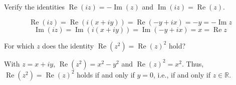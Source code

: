 \documentclass[12pt, answers]{exam}
\newcommand{\RR}{\mathbb{R}}
\renewcommand{\Re}{\operatorname{Re}}
\renewcommand{\Im}{\operatorname{Im}}
\begin{document}
\begin{questions}




    \question
    Verify the identities $\Re(iz) = -\Im(z)$ and $\Im(iz)=\Re(z)$.
    \begin{solution}
        \[\Re(iz) = \Re(i(x+iy)) = \Re(-y + ix) = -y = -\Im z\]
        \[\Im(iz) = \Im(i(x+iy)) = \Im(-y + ix) = x = \Re z\]
    \end{solution}
    
    

    \question
    For which $z$ does the identity $\Re(z^2)=\Re(z)^2$ hold?
    \begin{solution}
        With $z=x+iy$, $\Re(z^2)=x^2-y^2$ and $\Re(z)^2=x^2$.
        Thus, $\Re(z^2)=\Re(z)^2$ holds if and only if $y=0$, i.e., if and only if $z\in\RR$.
    \end{solution}




\end{questions}
\end{document}
